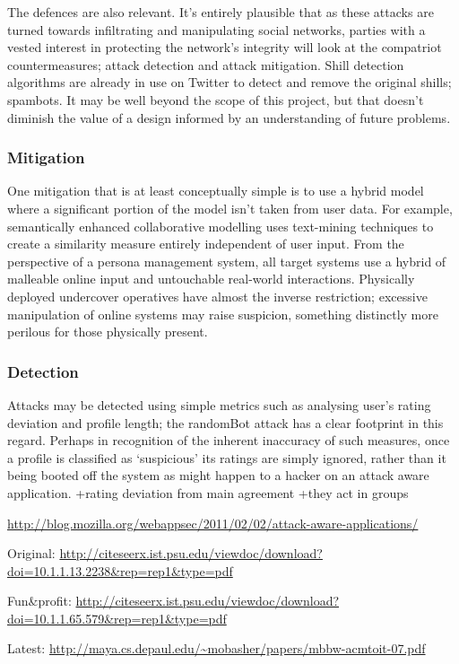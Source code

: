 The defences are also relevant. It’s entirely plausible that as these attacks are turned towards infiltrating and manipulating social networks, parties with a vested interest in protecting the network’s integrity will look at the compatriot countermeasures; attack detection and attack mitigation. Shill detection algorithms are already in use on Twitter to detect and remove the original shills; spambots. It may be well beyond the scope of this project, but that doesn’t diminish the value of a design informed by an understanding of future problems.

\subsubsection{Mitigation}

One mitigation that is at least conceptually simple  is to use a hybrid model where a significant portion of the model isn’t taken from user data. For example, semantically enhanced collaborative modelling uses text-mining techniques to create a similarity measure entirely independent of user input. From the perspective of a persona management system, all target systems use a hybrid of malleable online input and untouchable real-world interactions. Physically deployed undercover operatives have almost the inverse restriction; excessive manipulation of online systems may raise suspicion, something distinctly more perilous for those physically present.

\subsubsection{Detection}
Attacks may be detected using simple metrics such as analysing user’s rating deviation and profile length; the randomBot attack has a clear footprint in this regard. Perhaps in recognition of the inherent inaccuracy of such measures, once a profile is classified as `suspicious' its ratings are simply ignored, rather than it being booted off the system as might happen to a hacker on an attack aware application.
+rating deviation from main agreement
+they act in groups


\url{http://blog.mozilla.org/webappsec/2011/02/02/attack-aware-applications/}

Original: \url{http://citeseerx.ist.psu.edu/viewdoc/download?doi=10.1.1.13.2238\&rep=rep1\&type=pdf}

Fun\&profit: \url{http://citeseerx.ist.psu.edu/viewdoc/download?doi=10.1.1.65.579\&rep=rep1\&type=pdf}

Latest: \url{http://maya.cs.depaul.edu/~mobasher/papers/mbbw-acmtoit-07.pdf}